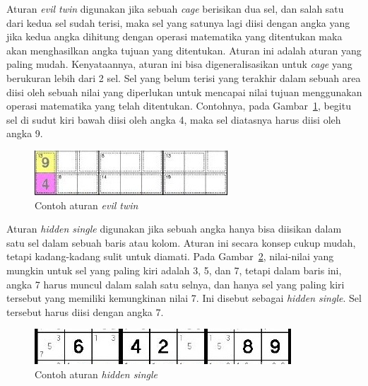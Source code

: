 Aturan \textit{evil twin} digunakan jika sebuah \textit{cage} berisikan dua sel, dan salah satu dari kedua sel sudah terisi, maka sel yang satunya lagi diisi dengan angka yang jika kedua angka dihitung dengan operasi matematika yang ditentukan maka akan menghasilkan angka tujuan yang ditentukan. Aturan ini adalah aturan yang paling mudah. Kenyataannya, aturan ini bisa digeneralisasikan untuk \textit{cage} yang berukuran lebih dari 2 sel. Sel yang belum terisi yang terakhir dalam sebuah area diisi oleh sebuah nilai yang diperlukan untuk mencapai nilai tujuan menggunakan operasi matematika yang telah ditentukan. Contohnya, pada Gambar~\ref{fig:hybrid3}, begitu sel di sudut kiri bawah diisi oleh angka 4, maka sel diatasnya harus diisi oleh angka 9.

\begin{figure}
\centering
\captionsetup{justification=centering}
\includegraphics[scale=1]{Gambar/HybridGenetic3}
\caption[Contoh aturan  \textit{evil twin}  ~\cite{johanna:12:hybrid}]{Contoh aturan  \textit{evil twin}  ~\cite{johanna:12:hybrid}}
\label{fig:hybrid3}
\end{figure}

Aturan \textit{hidden single} digunakan jika sebuah angka hanya bisa diisikan dalam satu sel dalam sebuah baris atau kolom. Aturan ini secara konsep cukup mudah, tetapi kadang-kadang sulit untuk diamati. Pada Gambar~\ref{fig:hybrid4}, nilai-nilai yang mungkin untuk sel yang paling kiri adalah 3, 5, dan 7, tetapi dalam baris ini, angka 7 harus muncul dalam salah satu selnya, dan hanya sel yang paling kiri tersebut yang memiliki kemungkinan nilai 7. Ini disebut sebagai \textit{hidden single}. Sel tersebut harus diisi dengan angka 7.

\begin{figure}
\centering
\captionsetup{justification=centering}
\includegraphics[scale=1]{Gambar/HybridGenetic4}
\caption[Contoh aturan  \textit{hidden single}  ~\cite{johanna:12:hybrid}]{Contoh aturan  \textit{hidden single}  ~\cite{johanna:12:hybrid}}
\label{fig:hybrid4}
\end{figure}

